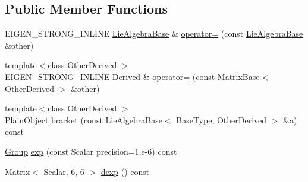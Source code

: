 \subsection*{Public Member Functions}
\begin{DoxyCompactItemize}
\item 
E\+I\+G\+E\+N\+\_\+\+S\+T\+R\+O\+N\+G\+\_\+\+I\+N\+L\+I\+NE \hyperlink{class_lie_algebra_base}{Lie\+Algebra\+Base} \& \hyperlink{class_lie_algebra_base_3_01_matrix_3_01typename_01internal_1_1traits_3_01_derived_01_4_1_1_scala449314c781550590437697c4dc21a6d4_aac0fa5e5bf38aae42e97aab8c6a13502}{operator=} (const \hyperlink{class_lie_algebra_base}{Lie\+Algebra\+Base} \&other)
\item 
{\footnotesize template$<$class Other\+Derived $>$ }\\E\+I\+G\+E\+N\+\_\+\+S\+T\+R\+O\+N\+G\+\_\+\+I\+N\+L\+I\+NE Derived \& \hyperlink{class_lie_algebra_base_3_01_matrix_3_01typename_01internal_1_1traits_3_01_derived_01_4_1_1_scala449314c781550590437697c4dc21a6d4_a181050e82398e48f0e7d171cdaa899d6}{operator=} (const Matrix\+Base$<$ Other\+Derived $>$ \&other)
\item 
{\footnotesize template$<$class Other\+Derived $>$ }\\\hyperlink{class_lie_algebra_base_3_01_matrix_3_01typename_01internal_1_1traits_3_01_derived_01_4_1_1_scala449314c781550590437697c4dc21a6d4_a7ce4eac189e072d4fddf555084b3d94f}{Plain\+Object} \hyperlink{class_lie_algebra_base_3_01_matrix_3_01typename_01internal_1_1traits_3_01_derived_01_4_1_1_scala449314c781550590437697c4dc21a6d4_a2ffbd92d09b85564bb06712ca119260c}{bracket} (const \hyperlink{class_lie_algebra_base}{Lie\+Algebra\+Base}$<$ \hyperlink{class_lie_algebra_base_3_01_matrix_3_01typename_01internal_1_1traits_3_01_derived_01_4_1_1_scala449314c781550590437697c4dc21a6d4_abb811fe29a9ece0ee6f2239f17fea23f}{Base\+Type}, Other\+Derived $>$ \&a) const
\item 
\hyperlink{class_lie_algebra_base_3_01_matrix_3_01typename_01internal_1_1traits_3_01_derived_01_4_1_1_scala449314c781550590437697c4dc21a6d4_a578d3791e63ec84b43491f4487f0dffa}{Group} \hyperlink{class_lie_algebra_base_3_01_matrix_3_01typename_01internal_1_1traits_3_01_derived_01_4_1_1_scala449314c781550590437697c4dc21a6d4_a7ad2d9384139b52f329ea8d5b836d6b1}{exp} (const Scalar precision=1.e-\/6) const
\item 
Matrix$<$ Scalar, 6, 6 $>$ \hyperlink{class_lie_algebra_base_3_01_matrix_3_01typename_01internal_1_1traits_3_01_derived_01_4_1_1_scala449314c781550590437697c4dc21a6d4_a051939fa1d57d1033430044d337cfaf1}{dexp} () const

\end{DoxyCompactItemize}
